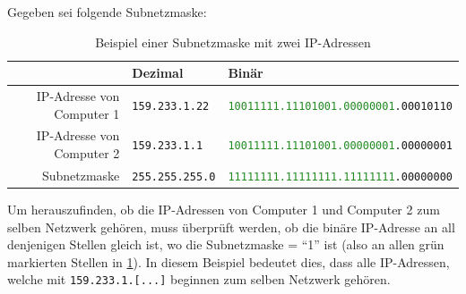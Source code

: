 \begin{myexample}[Subnetzmasken]\label{example:subnet}
Gegeben sei folgende Subnetzmaske:
\begin{table}[H]
	\centering
	\begin{tabular}{rll}
		                                     & Dezimal                & Binär                                                                 \\\midrule
		\acrshort{IP}-Adresse von Computer 1 & \texttt{159.233.1.22}  & \texttt{\textcolor{ForestGreen}{10011111.11101001.00000001}.00010110} \\\midrule
		\acrshort{IP}-Adresse von Computer 2 & \texttt{159.233.1.1}   & \texttt{\textcolor{ForestGreen}{10011111.11101001.00000001}.00000001} \\\midrule
		Subnetzmaske                         & \texttt{255.255.255.0} & \texttt{\textcolor{ForestGreen}{11111111.11111111.11111111}.00000000}
	\end{tabular}
	\caption{Beispiel einer Subnetzmaske mit zwei \gls{IP}-Adressen}
	\label{table:ex-subnet}
\end{table}
Um herauszufinden, ob die \gls{IP}-Adressen von Computer 1 und Computer 2 zum selben Netzwerk gehören, muss überprüft werden, ob die binäre \gls{IP}-Adresse an all denjenigen Stellen gleich ist, wo die Subnetzmaske = \enquote{1} ist (also an allen grün markierten Stellen in \cref{table:ex-subnet}). In diesem Beispiel bedeutet dies, dass alle \gls{IP}-Adressen, welche mit \texttt{159.233.1.[...]} beginnen zum selben Netzwerk gehören.
\end{myexample}


